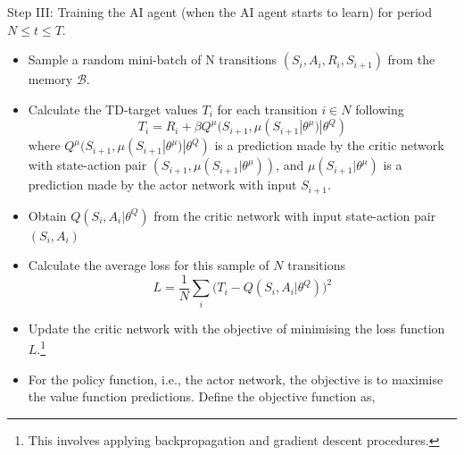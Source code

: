 \documentclass[hidelinks]{article}
\begin{document}
Step III: Training the AI agent (when the AI agent starts to learn) for period $N \leq t \leq T $.

\begin{itemize}
	\item Sample a random mini-batch of N transitions $(S_i, A_i, R_i, S_{i+1})$ from the memory $\mathcal{B}$.
	\item Calculate the TD-target values $T_{i}$ for each transition $i \in N$ following
	\begin{equation}
	T_{i} = R_i + \beta Q^{\mu}(S_{i+1},\mu(S_{i+1}|\theta^{\mu})|\theta^{Q})
	\end{equation}
	where $Q^{\mu}(S_{i+1},\mu(S_{i+1}|\theta^{\mu})|\theta^{Q})$ is a prediction made by the critic network with state-action pair $(S_{i+1},\mu(S_{i+1}|\theta^{\mu}))$, and $\mu(S_{i+1}|\theta^{\mu})$ is a prediction made by the actor network with input $S_{i+1}$.
	
%	
	\item Obtain $Q(S_i, A_i|\theta^Q)$ from the critic network with input state-action pair $(S_i, A_i)$
	
	
	\item Calculate the average loss for this sample of $N$ transitions
	\begin{equation}
	L = \frac{1}{N}\sum_i\big(T_i-Q(S_i,A_i|\theta^Q)\big)^2
	\end{equation}
	\item Update the critic network with the objective of minimising the loss function $L$.\footnote{This involves applying backpropagation and gradient descent procedures.} 
	
	\item For the policy function, i.e., the actor network, the objective is to maximise the value function predictions. Define the objective function as,
	

\end{itemize}
\end{document}
